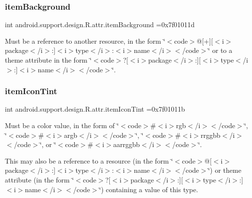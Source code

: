 \subsubsection{\texorpdfstring{item\+Background}{itemBackground}}
{\footnotesize\ttfamily int android.\+support.\+design.\+R.\+attr.\+item\+Background =0x7f01011d\hspace{0.3cm}{\ttfamily [static]}}

Must be a reference to another resource, in the form \char`\"{}$<$code$>$@\mbox{[}+\mbox{]}\mbox{[}$<$i$>$package$<$/i$>$\+:\mbox{]}$<$i$>$type$<$/i$>$\+:$<$i$>$name$<$/i$>$$<$/code$>$\char`\"{} or to a theme attribute in the form \char`\"{}$<$code$>$?\mbox{[}$<$i$>$package$<$/i$>$\+:\mbox{]}\mbox{[}$<$i$>$type$<$/i$>$\+:\mbox{]}$<$i$>$name$<$/i$>$$<$/code$>$\char`\"{}. \mbox{\label{classandroid_1_1support_1_1design_1_1R_1_1attr_a7020010c833f10c1e8fdba0f874a350f}} 
\subsubsection{\texorpdfstring{item\+Icon\+Tint}{itemIconTint}}
{\footnotesize\ttfamily int android.\+support.\+design.\+R.\+attr.\+item\+Icon\+Tint =0x7f01011b\hspace{0.3cm}{\ttfamily [static]}}

Must be a color value, in the form of \char`\"{}$<$code$>$\#$<$i$>$rgb$<$/i$>$$<$/code$>$\char`\"{}, \char`\"{}$<$code$>$\#$<$i$>$argb$<$/i$>$$<$/code$>$\char`\"{}, \char`\"{}$<$code$>$\#$<$i$>$rrggbb$<$/i$>$$<$/code$>$\char`\"{}, or \char`\"{}$<$code$>$\#$<$i$>$aarrggbb$<$/i$>$$<$/code$>$\char`\"{}. 

This may also be a reference to a resource (in the form \char`\"{}$<$code$>$@\mbox{[}$<$i$>$package$<$/i$>$\+:\mbox{]}$<$i$>$type$<$/i$>$\+:$<$i$>$name$<$/i$>$$<$/code$>$\char`\"{}) or theme attribute (in the form \char`\"{}$<$code$>$?\mbox{[}$<$i$>$package$<$/i$>$\+:\mbox{]}\mbox{[}$<$i$>$type$<$/i$>$\+:\mbox{]}$<$i$>$name$<$/i$>$$<$/code$>$\char`\"{}) containing a value of this type. \mbox{\label{classandroid_1_1support_1_1design_1_1R_1_1attr_af0fdea6a270ce35a04d199699e87cacb}} 
